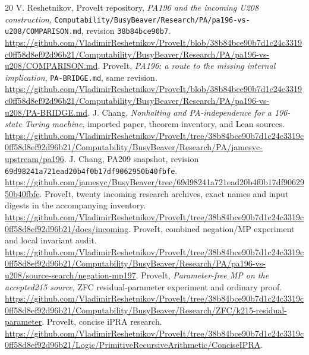 \documentclass[11pt,letterpaper]{article}
\newcommand{\file}[1]{\texttt{\nolinkurl{#1}}}
\begin{document}
\begin{thebibliography}{20}
\label{ref:comparison}
V. Reshetnikov, ProveIt repository, \emph{PA196 and the incoming U208
construction}, \file{Computability/BusyBeaver/Research/PA/pa196-vs-u208/COMPARISON.md},
revision \texttt{38b84bce90b7}.
\url{https://github.com/VladimirReshetnikov/ProveIt/blob/38b84bce90b7d1c24c3319c0ff58d8ef92d96b21/Computability/BusyBeaver/Research/PA/pa196-vs-u208/COMPARISON.md}.
\label{ref:bridge}
ProveIt, \emph{PA196: a route to the missing internal implication},
\file{PA-BRIDGE.md}, same revision.
\url{https://github.com/VladimirReshetnikov/ProveIt/blob/38b84bce90b7d1c24c3319c0ff58d8ef92d96b21/Computability/BusyBeaver/Research/PA/pa196-vs-u208/PA-BRIDGE.md}.
\label{ref:paper}
J. Chang, \emph{Nonhalting and PA-independence for a 196-state Turing machine},
imported paper, theorem inventory, and Lean sources.
\url{https://github.com/VladimirReshetnikov/ProveIt/tree/38b84bce90b7d1c24c3319c0ff58d8ef92d96b21/Computability/BusyBeaver/Research/PA/jamesyc-upstream/pa196}.
J. Chang, PA209 snapshot, revision
\texttt{69d98241a721ead20b4f0b17df9062950b40fbfe}.
\url{https://github.com/jamesyc/BusyBeaver/tree/69d98241a721ead20b4f0b17df9062950b40fbfe}.
ProveIt, twenty incoming research archives, exact names and input digests
in the accompanying inventory.
\url{https://github.com/VladimirReshetnikov/ProveIt/tree/38b84bce90b7d1c24c3319c0ff58d8ef92d96b21/docs/incoming}.
ProveIt, combined negation/MP experiment and local invariant audit.
\url{https://github.com/VladimirReshetnikov/ProveIt/tree/38b84bce90b7d1c24c3319c0ff58d8ef92d96b21/Computability/BusyBeaver/Research/PA/pa196-vs-u208/source-search/negation-mp197}.
ProveIt, \emph{Parameter-free MP on the accepted215 source},
ZFC residual-parameter experiment and ordinary proof.
\url{https://github.com/VladimirReshetnikov/ProveIt/tree/38b84bce90b7d1c24c3319c0ff58d8ef92d96b21/Computability/BusyBeaver/Research/ZFC/k215-residual-parameter}.
ProveIt, concise iPRA research.
\url{https://github.com/VladimirReshetnikov/ProveIt/tree/38b84bce90b7d1c24c3319c0ff58d8ef92d96b21/Logic/PrimitiveRecursiveArithmetic/ConciseIPRA}.
\end{thebibliography}
\end{document}
